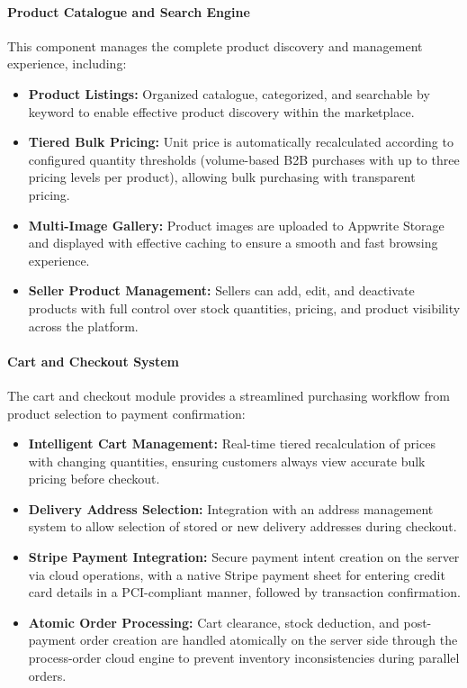\paragraph{Product Catalogue and Search Engine}
This component manages the complete product discovery and management experience, including:
\begin{itemize}
    \item \textbf{Product Listings:} Organized catalogue, categorized, and searchable by keyword to enable effective product discovery within the marketplace.
    \item \textbf{Tiered Bulk Pricing:} Unit price is automatically recalculated according to configured quantity thresholds (volume-based B2B purchases with up to three pricing levels per product), allowing bulk purchasing with transparent pricing.
    \item \textbf{Multi-Image Gallery:} Product images are uploaded to Appwrite Storage and displayed with effective caching to ensure a smooth and fast browsing experience.
    \item \textbf{Seller Product Management:} Sellers can add, edit, and deactivate products with full control over stock quantities, pricing, and product visibility across the platform.
\end{itemize}

\paragraph{Cart and Checkout System}
The cart and checkout module provides a streamlined purchasing workflow from product selection to payment confirmation:
\begin{itemize}
    \item \textbf{Intelligent Cart Management:} Real-time tiered recalculation of prices with changing quantities, ensuring customers always view accurate bulk pricing before checkout.
    \item \textbf{Delivery Address Selection:} Integration with an address management system to allow selection of stored or new delivery addresses during checkout.
    \item \textbf{Stripe Payment Integration:} Secure payment intent creation on the server via cloud operations, with a native Stripe payment sheet for entering credit card details in a PCI-compliant manner, followed by transaction confirmation.
    \item \textbf{Atomic Order Processing:} Cart clearance, stock deduction, and post-payment order creation are handled atomically on the server side through the process-order cloud engine to prevent inventory inconsistencies during parallel orders.
\end{itemize}

